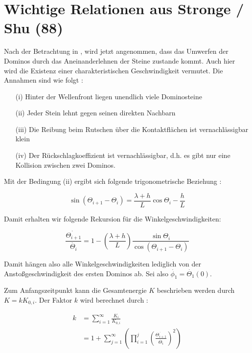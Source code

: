 \section{Wichtige Relationen aus Stronge / Shu (88) \label{Stronge88}}

Nach der Betrachtung in \cite{Stronge87}, wird jetzt angenommen, dass das Umwerfen der Dominos durch das Aneinanderlehnen der Steine zustande kommt. Auch hier wird die Existenz einer charakteristischen Geschwindigkeit vermutet. Die Annahmen sind wie folgt \cite{Stronge88}:

\begin{itemize}
	\item[(i)] Hinter der Wellenfront liegen unendlich  viele Dominosteine
	\item[(ii)] Jeder Stein lehnt gegen seinen direkten Nachbarn
	\item[(iii)] Die Reibung beim Rutschen über die Kontaktflächen ist vernachlässigbar klein
	\item[(iv)] Der Rückschlagkoeffizient ist vernachlässigbar, d.h. es gibt nur eine Kollision zwischen zwei Dominos.
\end{itemize}

Mit der Bedingung (ii) ergibt sich folgende trigonometrische Beziehung \cite{Stronge88}:

\begin{equation}
	\label{eq:trig}
	\sin(\Theta_{i+1} - \Theta_i) = \frac{\lambda + h}{L}\cos\Theta_i - \frac{h}{L}
\end{equation}

Damit erhalten wir folgende Rekursion für die Winkelgeschwindigkeiten:

\begin{equation}
    \label{eq:recursion}
	\frac{\dot{\Theta_{i+1}}}{\dot{\Theta_i}} = 1-(\frac{\lambda+h}{L})\frac{\sin\Theta_i}{\cos(\Theta_{i+1}-\Theta_i)}
\end{equation}

Damit hängen also alle Winkelgeschwindigkeiten lediglich von der Anstoßgeschwindigkeit des ersten Dominos ab. Sei also $ \dot{\phi_1} = \dot{\Theta_1}(0)$.

Zum Anfangszeitpunkt kann die Gesamtenergie $K$ beschrieben werden durch $K=k K_{0,i}$. Der Faktor $k$ wird berechnet durch \cite{Stronge88}:

\begin{equation}
    \label{eq:k}
    \begin{split}
        k & = \sum_{i=1}^{\infty} \frac{K_i}{K_{0,i}} \\
        & = 1+\sum_{j=1}^{\infty}(\prod_{i=1}^{j} (\frac{\dot{\Theta_{i+1}}}{\dot{\Theta_i}})^2)
    \end{split}
\end{equation}


